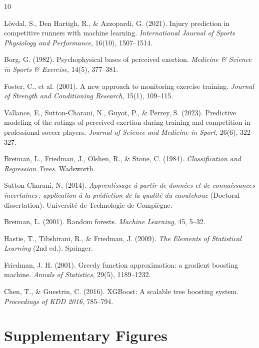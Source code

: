\documentclass[10pt, twocolumn]{article}
\begin{document}
\begin{thebibliography}{10}
\small

L{\"o}vdal, S., Den Hartigh, R., \& Azzopardi, G. (2021).
Injury prediction in competitive runners with machine learning.
\textit{International Journal of Sports Physiology and Performance},
16(10), 1507--1514.

Borg, G. (1982).
Psychophysical bases of perceived exertion.
\textit{Medicine \& Science in Sports \& Exercise}, 14(5), 377--381.

Foster, C., et al. (2001).
A new approach to monitoring exercise training.
\textit{Journal of Strength and Conditioning Research}, 15(1), 109--115.

Vallance, E., Sutton-Charani, N., Guyot, P., \& Perrey, S. (2023).
Predictive modeling of the ratings of perceived exertion during training
and competition in professional soccer players.
\textit{Journal of Science and Medicine in Sport}, 26(6), 322--327.

Breiman, L., Friedman, J., Olshen, R., \& Stone, C. (1984).
\textit{Classification and Regression Trees}. Wadsworth.

Sutton-Charani, N. (2014).
\textit{Apprentissage \`a partir de donn\'ees et de connaissances
incertaines\,: application \`a la pr\'ediction de la qualit\'e du
caoutchouc} (Doctoral dissertation). Universit\'e de Technologie de
Compi\`egne.

Breiman, L. (2001).
Random forests.
\textit{Machine Learning}, 45, 5--32.

Hastie, T., Tibshirani, R., \& Friedman, J. (2009).
\textit{The Elements of Statistical Learning} (2nd ed.). Springer.

Friedman, J. H. (2001).
Greedy function approximation: a gradient boosting machine.
\textit{Annals of Statistics}, 29(5), 1189--1232.

Chen, T., \& Guestrin, C. (2016).
XGBoost: A scalable tree boosting system.
\textit{Proceedings of KDD 2016}, 785--794.

\end{thebibliography}

\appendix
\onecolumn
\section{Supplementary Figures}
\vspace{-0.3cm}
\end{document}
